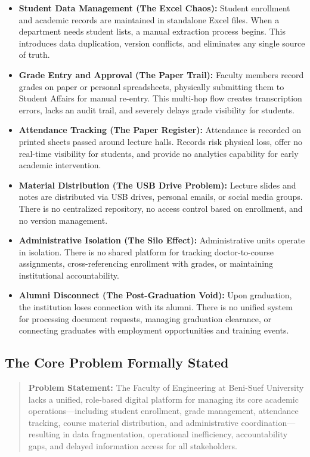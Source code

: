 \begin{itemize}
    \item \textbf{Student Data Management (The Excel Chaos):} Student enrollment and academic records are maintained in standalone Excel files. When a department needs student lists, a manual extraction process begins. This introduces data duplication, version conflicts, and eliminates any single source of truth.
    \item \textbf{Grade Entry and Approval (The Paper Trail):} Faculty members record grades on paper or personal spreadsheets, physically submitting them to Student Affairs for manual re-entry. This multi-hop flow creates transcription errors, lacks an audit trail, and severely delays grade visibility for students.
    \item \textbf{Attendance Tracking (The Paper Register):} Attendance is recorded on printed sheets passed around lecture halls. Records risk physical loss, offer no real-time visibility for students, and provide no analytics capability for early academic intervention.
    \item \textbf{Material Distribution (The USB Drive Problem):} Lecture slides and notes are distributed via USB drives, personal emails, or social media groups. There is no centralized repository, no access control based on enrollment, and no version management.
    \item \textbf{Administrative Isolation (The Silo Effect):} Administrative units operate in isolation. There is no shared platform for tracking doctor-to-course assignments, cross-referencing enrollment with grades, or maintaining institutional accountability.
    \item \textbf{Alumni Disconnect (The Post-Graduation Void):} Upon graduation, the institution loses connection with its alumni. There is no unified system for processing document requests, managing graduation clearance, or connecting graduates with employment opportunities and training events.
\end{itemize}

\subsection{The Core Problem Formally Stated}

\begin{quote}
\textbf{Problem Statement:} The Faculty of Engineering at Beni-Suef University lacks a unified, role-based digital platform for managing its core academic operations---including student enrollment, grade management, attendance tracking, course material distribution, and administrative coordination---resulting in data fragmentation, operational inefficiency, accountability gaps, and delayed information access for all stakeholders.
\end{quote}

